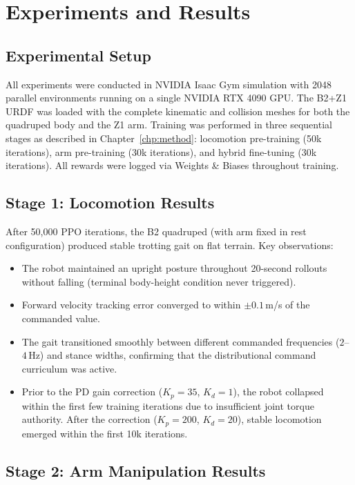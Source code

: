 
\chapter{Experiments and Results} \label{chp:exp}

\section{Experimental Setup}

All experiments were conducted in NVIDIA Isaac Gym simulation with 2048
parallel environments running on a single NVIDIA RTX 4090 GPU.
The B2+Z1 URDF was loaded with the complete kinematic and collision meshes
for both the quadruped body and the Z1 arm.
Training was performed in three sequential stages as described in
Chapter~\ref{chp:method}: locomotion pre-training (50k iterations),
arm pre-training (30k iterations), and hybrid fine-tuning (30k iterations).
All rewards were logged via Weights \& Biases throughout training.

\section{Stage 1: Locomotion Results}

After 50,000 PPO iterations, the B2 quadruped (with arm fixed in rest
configuration) produced stable trotting gait on flat terrain.
Key observations:
\begin{itemize}
  \item The robot maintained an upright posture throughout 20-second rollouts
        without falling (terminal body-height condition never triggered).
  \item Forward velocity tracking error converged to within
        $\pm 0.1$\,m/s of the commanded value.
  \item The gait transitioned smoothly between different commanded
        frequencies ($2$--$4$\,Hz) and stance widths, confirming that
        the distributional command curriculum was active.
  \item Prior to the PD gain correction ($K_p=35$, $K_d=1$), the robot
        collapsed within the first few training iterations due to
        insufficient joint torque authority.  After the correction
        ($K_p=200$, $K_d=20$), stable locomotion emerged within the
        first 10k iterations.
\end{itemize}

\section{Stage 2: Arm Manipulation Results}

